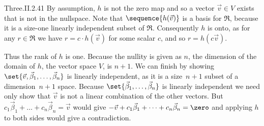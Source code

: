 \begin{ans}{Three.II.2.41}
      By assumption, \( h \) is not the zero map
      and so a vector \( \vec{v}\in V \) exists that is not in the nullspace.
      Note that \( \sequence{h(\vec{v})} \) is a basis for \( \Re \),
      because it is a size-one linearly independent subset of \( \Re \).
      Consequently \( h \) is onto, as for any \( r\in\Re \) we have
      \( r=c\cdot h(\vec{v}) \) for some scalar \( c \), and so
      \( r=h(c\vec{v}) \).

      Thus the rank of \( h \) is one.
      Because the nullity is given as $n$, the dimension of the domain of
      \( h \), the vector space \( V \), is \( n+1 \).
      We can finish by showing
      \( \set{\vec{v},\vec{\beta}_1,\dots,\vec{\beta}_n} \)
      is linearly independent, as it is a size~$n+1$ subset of a
      dimension~$n+1$ space.
      Because \( \set{\vec{\beta}_1,\dots,\vec{\beta}_n} \) is linearly
      independent we need only show that
      \( \vec{v} \) is not a linear combination of the other vectors.
      But \( c_1\vec{\beta}_1+\dots+c_n\vec{\beta}_n=\vec{v} \) would give
      \( -\vec{v}+c_1\vec{\beta}_1+\dots+c_n\vec{\beta}_n=\zero \) and applying
      \( h \) to both sides would give a contradiction.
    
\end{ans}
